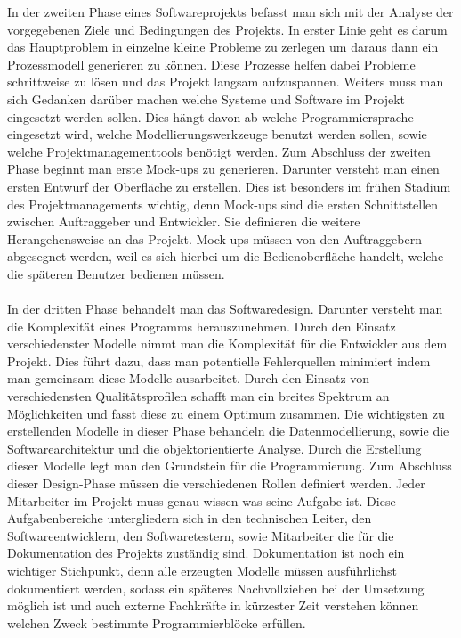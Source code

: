 \documentclass{llncs}
\begin{document}
In der zweiten Phase eines Softwareprojekts befasst man sich mit der Analyse der vorgegebenen Ziele und Bedingungen des Projekts. In erster Linie geht es darum das Hauptproblem in einzelne kleine Probleme zu zerlegen um daraus dann ein Prozessmodell generieren zu können. Diese Prozesse helfen dabei Probleme schrittweise zu lösen und das Projekt langsam aufzuspannen. Weiters muss man sich Gedanken darüber machen welche Systeme und Software im Projekt eingesetzt werden sollen. Dies hängt davon ab welche Programmiersprache eingesetzt wird, welche Modellierungswerkzeuge benutzt werden sollen, sowie welche Projektmanagementtools benötigt werden. Zum Abschluss der zweiten Phase beginnt man erste Mock-ups zu generieren. Darunter versteht man einen ersten Entwurf der Oberfläche zu erstellen. Dies ist besonders im frühen Stadium des Projektmanagements wichtig, denn Mock-ups sind die ersten Schnittstellen zwischen Auftraggeber und Entwickler. Sie definieren die weitere Herangehensweise an das Projekt. Mock-ups müssen von den Auftraggebern abgesegnet werden, weil es sich hierbei um die Bedienoberfläche handelt, welche die späteren Benutzer bedienen müssen.
\\ \\
In der dritten Phase behandelt man das Softwaredesign. Darunter versteht man die Komplexität eines Programms herauszunehmen. Durch den Einsatz verschiedenster Modelle nimmt man die Komplexität für die Entwickler aus dem Projekt. Dies führt dazu, dass man potentielle Fehlerquellen minimiert indem man gemeinsam diese Modelle ausarbeitet. Durch den Einsatz von verschiedensten Qualitätsprofilen schafft man ein breites Spektrum an Möglichkeiten und fasst diese zu einem Optimum zusammen. Die wichtigsten zu erstellenden Modelle in dieser Phase behandeln die Datenmodellierung, sowie die Softwarearchitektur und die objektorientierte Analyse. Durch die Erstellung dieser Modelle legt man den Grundstein für die Programmierung. Zum Abschluss dieser Design-Phase müssen die verschiedenen Rollen definiert werden. Jeder Mitarbeiter im Projekt muss genau wissen was seine Aufgabe ist. Diese Aufgabenbereiche untergliedern sich in den technischen Leiter, den Softwareentwicklern, den Softwaretestern, sowie Mitarbeiter die für die Dokumentation des Projekts zuständig sind. Dokumentation ist noch ein wichtiger Stichpunkt, denn alle erzeugten Modelle müssen ausführlichst dokumentiert werden, sodass ein späteres Nachvollziehen bei der Umsetzung möglich ist und auch externe Fachkräfte in kürzester Zeit verstehen können welchen Zweck bestimmte Programmierblöcke erfüllen.
\end{document}
